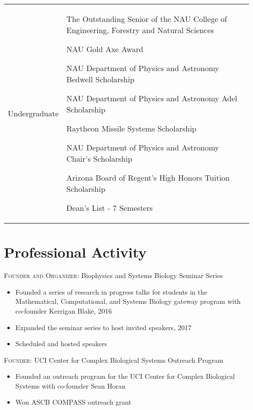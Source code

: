 \documentclass[letterpaper,10pt]{article} %
\makeatletter
\newcommand\cellwidth{\TX@col@width}
\makeatother
\begin{document}
\begin{tabularx}{\textwidth}{>{\raggedleft}p{} | X}
Undergraduate & 
\begin{minipage}{\cellwidth}
\begin{description}[itemsep=.25ex,labelsep=0em]
\item The Outstanding Senior of the NAU College of Engineering, Forestry and Natural Sciences 
\item NAU Gold Axe Award
\item NAU Department of Physics and Astronomy Bedwell Scholarship 
\item NAU Department of Physics and Astronomy Adel Scholarship 
\item Raytheon Missile Systems Scholarship 
\item NAU Department of Physics and Astronomy Chair's Scholarship 
\item Arizona Board of Regent's High Honors Tuition Scholarship 
\item Dean's List - 7 Semesters
\end{description}
\end{minipage}
\end{tabularx}


\section*{Professional Activity}

\textsc{Founder and Organizer:} Biophysics and Systems Biology Seminar Series
\begin{itemize}
\item Founded a series of research in progress talks for students in the Mathematical, Computational, and Systems Biology gateway program with co-founder Kerrigan Blake, 2016
\item Expanded the seminar series to host invited speakers, 2017
\item Scheduled and hosted speakers
\end{itemize}

\textsc{Founder:} UCI Center for Complex Biological Systems Outreach Program
\begin{itemize}
\item Founded an outreach program for the UCI Center for Complex Biological Systems with co-founder Sean Horan
\item Won ASCB COMPASS outreach grant
\end{itemize}
\end{document}
